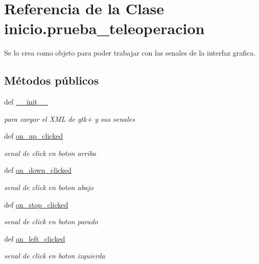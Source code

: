 \hypertarget{classinicio_1_1prueba__teleoperacion}{
\section{Referencia de la Clase inicio.prueba\_\-teleoperacion}
\label{classinicio_1_1prueba__teleoperacion}
}


Se lo crea como objeto para poder trabajar con las senales de la interfaz grafica.  


\subsection*{Métodos públicos}
\begin{DoxyCompactItemize}
\item 
def \hyperlink{classinicio_1_1prueba__teleoperacion_a351696d88b58fde99970687f2bd86222}{\_\-\_\-init\_\-\_\-}
\begin{DoxyCompactList}\small\item\em para cargar el XML de gtk+ y sus senales \end{DoxyCompactList}\item 
def \hyperlink{classinicio_1_1prueba__teleoperacion_a2a4cbc2a2b1682b8099afa444182e172}{on\_\-up\_\-clicked}
\begin{DoxyCompactList}\small\item\em senal de click en boton arriba \end{DoxyCompactList}\item 
def \hyperlink{classinicio_1_1prueba__teleoperacion_aa5dad2fd62306d96fd40076dfe34e01c}{on\_\-down\_\-clicked}
\begin{DoxyCompactList}\small\item\em senal de click en boton abajo \end{DoxyCompactList}\item 
def \hyperlink{classinicio_1_1prueba__teleoperacion_a908d749ffc2af5679a2d5009fd4ee8c4}{on\_\-stop\_\-clicked}
\begin{DoxyCompactList}\small\item\em senal de click en boton parado \end{DoxyCompactList}\item 
def \hyperlink{classinicio_1_1prueba__teleoperacion_aea41c731f9b85c6fa4aaed25c444f546}{on\_\-left\_\-clicked}
\begin{DoxyCompactList}\small\item\em senal de click en boton izquierda \end{DoxyCompactList}\item 

\end{DoxyCompactItemize}
